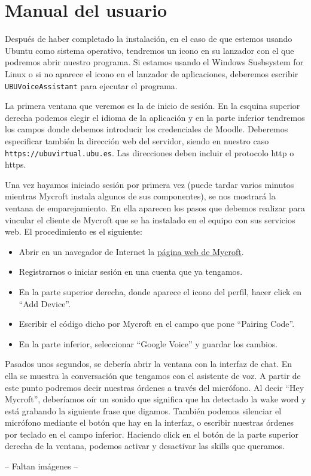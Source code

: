 \section{Manual del usuario}
Después de haber completado la instalación, en el caso de que estemos usando Ubuntu como sistema operativo, tendremos un icono en su lanzador con el que podremos abrir nuestro programa. Si estamos usando el Windows Susbsystem for Linux o si no aparece el icono en el lanzador de aplicaciones, deberemos escribir \texttt{UBUVoiceAssistant} para ejecutar el programa.

La primera ventana que veremos es la de inicio de sesión. En la esquina superior derecha podemos elegir el idioma de la aplicación y en la parte inferior tendremos los campos donde debemos introducir los credenciales de Moodle. Deberemos especificar también la dirección web del servidor, siendo en nuestro caso \texttt{https://ubuvirtual.ubu.es}. Las direcciones deben incluir el protocolo http o https.

Una vez hayamos iniciado sesión por primera vez (puede tardar varios minutos mientras Mycroft instala algunos de sus componentes), se nos mostrará la ventana de emparejamiento. En ella aparecen los pasos que debemos realizar para vincular el cliente de Mycroft que se ha instalado en el equipo con sus servicios web. El procedimiento es el siguiente:
\begin{itemize}
    \item Abrir en un navegador de Internet la \href{https://mycroft.ai}{página web de Mycroft}.
    \item Registrarnos o iniciar sesión en una cuenta que ya tengamos.
    \item En la parte superior derecha, donde aparece el icono del perfil, hacer click en ``Add Device''.
    \item Escribir el código dicho por Mycroft en el campo que pone ``Pairing Code''.
    \item En la parte inferior, seleccionar ``Google Voice'' y guardar los cambios.
\end{itemize}

Pasados unos segundos, se debería abrir la ventana con la interfaz de chat. En ella se muestra la conversación que tengamos con el asistente de voz. A partir de este punto podremos decir nuestras órdenes a través del micrófono. Al decir ``Hey Mycroft'', deberíamos oír un sonido que significa que ha detectado la wake word y está grabando la siguiente frase que digamos. También podemos silenciar el micrófono mediante el botón que hay en la interfaz, o escribir nuestras órdenes por teclado en el campo inferior. Haciendo click en el botón de la parte superior derecha de la ventana, podemos activar y desactivar las skills que queramos.

-- Faltan imágenes --